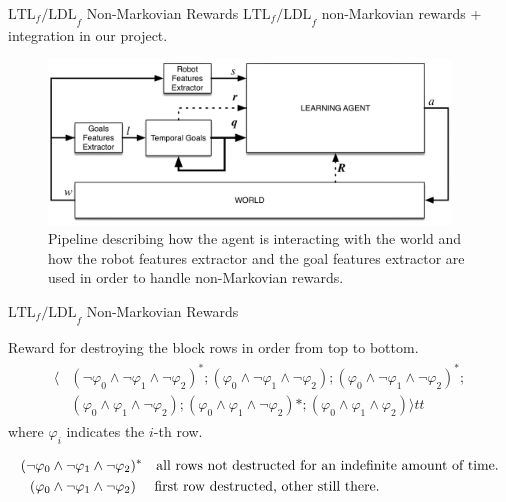\begin{frame}{$\text{LTL}_f\text{/LDL}_f$ Non-Markovian Rewards}
    $\text{LTL}_f\text{/LDL}_f$ non-Markovian rewards + integration
    in our project.
    \begin{figure}
        \centering
        \includegraphics[width=0.95\textwidth]{images/rl-temporalgoals-pipeline.png}
        \caption{Pipeline describing how the agent is interacting with the
            world and how the robot features extractor and the goal features
            extractor are used in order to handle non-Markovian rewards.}
        \label{fig:rl-temporalgoals-pipeline}
    \end{figure}
\end{frame}

\begin{frame}{$\text{LTL}_f\text{/LDL}_f$ Non-Markovian Rewards}
	\begin{block}{}
		Reward for destroying the block rows in order from top to bottom.
		\begin{align*}
		\begin{split}
		\langle&(\neg\varphi_0 \land \neg\varphi_1 \land \neg\varphi_2)^*;
		(\varphi_0 \land \neg\varphi_1 \land \neg\varphi_2);
		(\varphi_0 \land \neg\varphi_1 \land \neg\varphi_2)^*;\\
		&(\varphi_0 \land \varphi_1 \land \neg\varphi_2);
		(\varphi_0 \land \varphi_1 \land \neg\varphi_2)*;
		(\varphi_0 \land \varphi_1 \land \varphi_2)\rangle tt
		\end{split}
		\end{align*}
		where $\varphi_i$ indicates the $i$-th row.
	\end{block}
	
	\begin{block}{}
		\begin{align*}
			(\neg\varphi_0\land \neg\varphi_1\land\neg\varphi_2)&^*
			\text{\quad all rows not destructed for an indefinite amount of time.} \\
			(\varphi_0 \land \neg\varphi_1 \land \neg\varphi_2)&\ 
			\text{\quad first row destructed, other still there.}\\	
		\end{align*}
	\end{block}
\end{frame}


